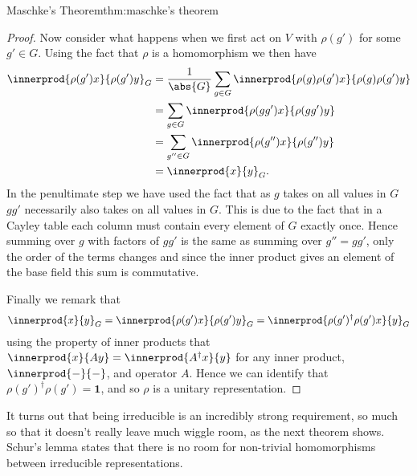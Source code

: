 \documentclass[fleqn]{NotesClass}
\newcommand*{\hermit}{\dagger}
\newcommand*{\ident}{\mathbf{1}}
\begin{document}
\begin{thm}{Maschke's Theorem}{thm:maschke's theorem}
\begin{proof}
            Now consider what happens when we first act on \(V\) with \(\rho(g')\) for some \(g' \in G\).
            Using the fact that \(\rho\) is a homomorphism we then have
            \begin{align}
                \innerprod{\rho(g')x}{\rho(g')y}_G &= \frac{1}{\abs{G}} \sum_{g \in G} \innerprod{\rho(g)\rho(g')x}{\rho(g)\rho(g')y}\\
                &= \sum_{g\in G} \innerprod{\rho(gg')x}{\rho(gg')y}\\
                &= \sum_{g''\in G} \innerprod{\rho(g'')x}{\rho(g'')y}\\
                &= \innerprod{x}{y}_G.
            \end{align}
            In the penultimate step we have used the fact that as \(g\) takes on all values in \(G\) \(gg'\) necessarily also takes on all values in \(G\).
            This is due to the fact that in a Cayley table each column must contain every element of \(G\) exactly once.
            Hence summing over \(g\) with factors of \(gg'\) is the same as summing over \(g'' = gg'\), only the order of the terms changes and since the inner product gives an element of the base field this sum is commutative.
            
            Finally we remark that 
            \begin{equation}
                \innerprod{x}{y}_G = \innerprod{\rho(g')x}{\rho(g')y}_G = \innerprod{\rho(g')^\hermit \rho(g') x}{y}_G
            \end{equation}
            using the property of inner products that \(\innerprod{x}{Ay} = \innerprod{A^\hermit x}{y}\) for any inner product, \(\innerprod{-}{-}\), and operator \(A\).
            Hence we can identify that \(\rho(g')^\hermit \rho(g') = \ident\), and so \(\rho\) is a unitary representation.
        \end{proof}
    \end{thm}
    
    It turns out that being irreducible is an incredibly strong requirement, so much so that it doesn't really leave much wiggle room, as the next theorem shows.
    Schur's lemma states that there is no room for non-trivial homomorphisms between irreducible representations.
    
\end{document}
